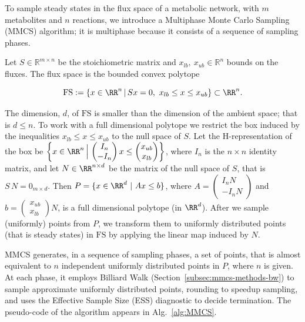    To sample steady states in the flux space of a metabolic network, with $m$
   metabolites and $n$ reactions, we introduce a Multiphase Monte Carlo Sampling
   (MMCS) algorithm; it is multiphase because it consists of a sequence of sampling
   phases.

   Let $S\in\mathbb{R}^{m\times n}$ be the  stoichiometric matrix
   and  $x_{lb},\ x_{ub}\in\mathbb{R}^{n}$
   bounds on the fluxes.
   The flux space is the bounded convex polytope

   \begin{equation}
   \label{eq:steady_states}
      \mathrm{FS} :=  \{x \in \RR^n \,|\, Sx = 0,\ x_{lb}\leq x \leq x_{ub} \} \subset \RR^n .
   \end{equation}

   The dimension, $d$, of $\mathrm{FS}$ is smaller than the dimension of the
   ambient space; that is $d \leq n$.
   To work with a full dimensional polytope we restrict the box
   induced by the inequalities $x_{lb}\leq x \leq x_{ub}$ to the null space of  $S$.
   Let the  H-representation of the box be
   $\left\{ x \in \RR^n \,\Big |\, \begin{pmatrix} I_n \\ -I_n\end{pmatrix} x
   \leq \begin{pmatrix} x_{ub} \\ x_{lb} \end{pmatrix} \right\}$,
   where $I_n$ is the $n\times n$ identity matrix,
   and let $N\in\RR^{n\times d}$ be the matrix of the null space of $S$,
   that is $S \, N = 0_{m \times d}$.
   Then
   $P = \{ x\in\RR^d\ |\ A x \leq b \}$,
   where $A = \begin{pmatrix} I_n N \\ -I_n N\end{pmatrix}$
   and $b = \begin{pmatrix} x_{ub} \\ x_{lb} \end{pmatrix}  N$,
   is a
   full dimensional polytope (in $\RR^d$).
   After we sample (uniformly) points from $P$,
   we transform them to uniformly distributed points (that is steady states) in $\mathrm{FS}$
   by applying  the linear map induced by $N$.

   \vspace{8pt}
   MMCS generates, in a sequence of sampling phases, a set of points,
   that is almost equivalent to $n$ independent uniformly distributed points in $P$, where $n$ is given.
   At each phase, it employs Billiard Walk (Section~\ref{subsec:mmcs-methods-bw}) 
   to sample approximate uniformly distributed points, rounding
   to speedup sampling,
   and uses the Effective Sample Size (ESS) diagnostic to decide termination.
   The pseudo-code of the algorithm appears in Alg.~\ref{alg:MMCS}.


